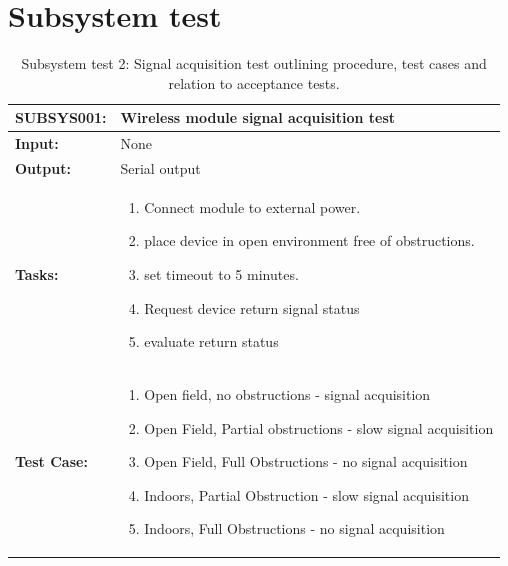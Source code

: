 \section{Subsystem test}
\begin{table}[H]
    \centering
    \caption{Subsystem test 2: Signal acquisition test outlining procedure, test cases and relation to acceptance tests.}
    \begin{tabular}{|m{}|m{}|}
    \hline
       \textbf{SUBSYS001: }  &  Wireless module signal acquisition test\\
       \hline
        \textbf{Input: } &  None\\
        \hline
        \textbf{Output: } & Serial output\\
        \hline
        \textbf{Tasks: } & \begin{enumerate}
        \vspace{1mm}
            \item Connect module to external power.
            \item place device in open environment free of obstructions.
            \item set timeout to 5 minutes.
            \item Request device return signal status
            \item evaluate return status
        \end{enumerate}\\
        \hline
        \textbf{Test Case: } & \begin{enumerate}
            \vspace{1mm}
            \item Open field, no obstructions - signal acquisition
            \item Open Field, Partial obstructions - slow signal acquisition
            \item Open Field, Full Obstructions - no signal acquisition
            \item Indoors, Partial Obstruction - slow signal acquisition
            \item Indoors, Full Obstructions - no signal acquisition
        \end{enumerate}\\
        \hline

    \end{tabular}
    \label{tab:SUBSYS001}
\end{table}


